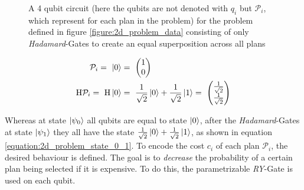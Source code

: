 \begin{figure}[!h]
    \centering
    \caption{A 4 qubit circuit (here the qubits are not denoted with $q_i$ but $\mathcal{P}_i$, which represent for each plan in the problem) for the problem defined in figure \ref{figure:2d_problem_data} consisting of only \emph{Hadamard}-Gates to create an equal superposition across all plans}
    \label{figure:4_qubit_circuit_with_h_gates}
\end{figure}

\begin{equation}
    \centering
    \begin{split}
        \mathcal{P}_i =\ \ket{0} &=\ \begin{pmatrix}1 \\ 0\end{pmatrix}\\
        \mathrm{H}\mathcal{P}_i =\ \mathrm{H}\ket{0} &=\ \frac{1}{\sqrt{2}}\ket{0} + \frac{1}{\sqrt{2}}\ket{1} =\ \begin{pmatrix}\frac{1}{\sqrt{2}} \\ \frac{1}{\sqrt{2}}\end{pmatrix}\\
    \end{split}
    \label{equation:2d_problem_state_0_1}
\end{equation}

Whereas at state $\ket{\psi_0}$ all qubits are equal to state $\ket{0}$, after the \emph{Hadamard}-Gates at state $\ket{\psi_1}$ they all have the state $\frac{1}{\sqrt{2}}\ket{0} + \frac{1}{\sqrt{2}}\ket{1}$, as shown in equation \ref{equation:2d_problem_state_0_1}. To encode the cost $c_i$ of each plan $\mathcal{P}_i$, the desired behaviour is defined. The goal is to \emph{decrease} the probability of a certain plan being selected if it is expensive. To do this, the parametrizable \emph{RY}-Gate is used on each qubit.


